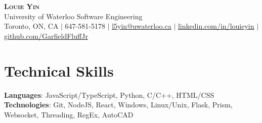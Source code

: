 \documentclass[letterpaper,11pt]{article}
\begin{document}

\begin{center}
    \textbf{\Huge \scshape Louie Yin} \\
    \Large University of Waterloo Software Engineering \\ \vspace{3pt}
    \small Toronto, ON, CA $|$
    \small 647-581-5178 $|$ \href{mailto:l5yin@uwaterloo.ca}{\underline{l5yin@uwaterloo.ca}} $|$ 
    \href{https://www.linkedin.com/in/louieyin/}{\underline{linkedin.com/in/louieyin}} $|$
    \href{https://github.com/GarfieldFluffJr}{\underline{github.com/GarfieldFluffJr}}
\end{center}

\vspace{-12pt}


\section{Technical Skills}
 \begin{itemize}[leftmargin=0.15in, label={}]
    \small{\item{
     \textbf{Languages}{: JavaScript/TypeScript, Python, C/C++, HTML/CSS} \\
     \textbf{Technologies}{: Git, NodeJS, React, Windows, Linux/Unix, Flask, Prism, Websocket, Threading, RegEx, AutoCAD} \\
     \textbf{}
    }}
 \end{itemize}

 \vspace{-22pt}



\end{document}
